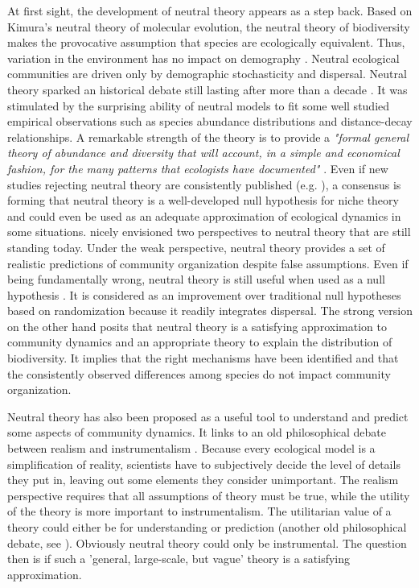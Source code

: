 \documentclass[12pt]{article}
\begin{document}
At first sight, the development of neutral theory appears as a step back. Based on Kimura's neutral theory of molecular evolution, the neutral theory of biodiversity makes the provocative
assumption that species are ecologically equivalent. Thus, variation in
the environment has no impact on demography \parencite{Bell2000,Hubbell2001}. Neutral
ecological communities are driven only by demographic stochasticity and dispersal. Neutral theory sparked an historical debate still lasting after more
than a decade \parencite{Chave2004, Etiennee2011, Rosindell2012,Clark2012}. It
was stimulated by the surprising ability of neutral models to fit some well
studied empirical observations such as species abundance distributions and
distance-decay relationships. A remarkable strength of the theory is to
provide a \emph{"formal general theory of abundance and diversity that will
account, in a simple and economical fashion, for the many patterns that
ecologists have documented"} \parencite{Bell2001}. Even if new studies rejecting
neutral theory are consistently published (e.g.  \textcite{Ricklefs2012}), a consensus is forming that neutral theory is a well-developed null
hypothesis for niche theory and could even be used as an adequate approximation
of ecological dynamics in some situations.  \textcite{Bell2001} nicely
envisioned two perspectives to neutral theory that are still standing today.
Under the weak perspective, neutral theory provides a set of realistic
predictions of community organization despite false assumptions. Even if being
fundamentally wrong, neutral theory is still useful when used as a null
hypothesis \parencite{Gotelli2006}. It is considered as an improvement over
traditional null hypotheses based on randomization \parencite{Gotelli2000}
because it readily integrates dispersal. The strong version on the other hand
posits that neutral theory is a satisfying approximation to community dynamics
and an appropriate theory to explain the distribution of biodiversity. It
implies that the right mechanisms have been identified and that the consistently
observed differences among species do not impact community organization. 

Neutral theory has also been proposed as a useful tool to understand and predict
some aspects of community dynamics. It links to an old philosophical debate
between realism and instrumentalism \parencite{Wennekes2011}. Because every
ecological model is a simplification of reality, scientists have to
subjectively decide the level of details they put in, leaving out some elements they consider unimportant. The realism perspective requires that all assumptions of
theory must be true, while the utility of the theory is more important to
instrumentalism. The utilitarian value of a theory could either be for
understanding or prediction (another old philosophical debate, see
\textcite{Schmueli2010}). Obviously neutral theory could only be instrumental.
The question then is if such a 'general, large-scale, but vague' theory
\parencite{Wennekes2011} is a satisfying approximation. 
\end{document}
